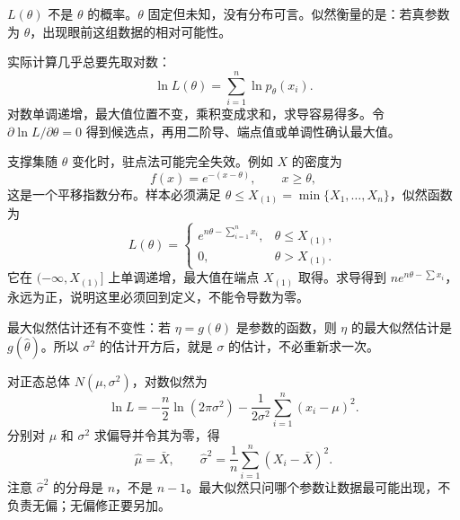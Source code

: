 $L(\theta)$ 不是 $\theta$ 的概率。$\theta$ 固定但未知，没有分布可言。似然衡量的是：若真参数为 $\theta$，出现眼前这组数据的相对可能性。

实际计算几乎总要先取对数：
\[
\ln L(\theta)=\sum_{i=1}^{n}\ln p_\theta(x_i).
\]
对数单调递增，最大值位置不变，乘积变成求和，求导容易得多。令 $\partial\ln L/\partial\theta=0$ 得到候选点，再用二阶导、端点值或单调性确认最大值。

支撑集随 $\theta$ 变化时，驻点法可能完全失效。例如 $X$ 的密度为
\[
f(x)=e^{-(x-\theta)},\qquad x\ge\theta,
\]
这是一个平移指数分布。样本必须满足 $\theta\le X_{(1)}=\min\{X_1,\ldots,X_n\}$，似然函数为
\[
L(\theta)=\begin{cases}
e^{n\theta-\sum_{i=1}^{n}x_i}, & \theta\le X_{(1)},\\
0, & \theta>X_{(1)}.
\end{cases}
\]
它在 $(-\infty,X_{(1)}]$ 上单调递增，最大值在端点 $X_{(1)}$ 取得。求导得到 $n e^{n\theta-\sum x_i}$，永远为正，说明这里必须回到定义，不能令导数为零。

最大似然估计还有不变性：若 $\eta=g(\theta)$ 是参数的函数，则 $\eta$ 的最大似然估计是 $g(\widehat\theta)$。所以 $\sigma^2$ 的估计开方后，就是 $\sigma$ 的估计，不必重新求一次。

对正态总体 $N(\mu,\sigma^2)$，对数似然为
\[
\ln L=-\frac n2\ln(2\pi\sigma^2)-\frac{1}{2\sigma^2}\sum_{i=1}^{n}(x_i-\mu)^2.
\]
分别对 $\mu$ 和 $\sigma^2$ 求偏导并令其为零，得
\[
\widehat\mu=\bar X,\qquad
\widehat\sigma^2=\frac1n\sum_{i=1}^{n}(X_i-\bar X)^2.
\]
注意 $\widehat\sigma^2$ 的分母是 $n$，不是 $n-1$。最大似然只问哪个参数让数据最可能出现，不负责无偏；无偏修正要另加。

\begin{center}
\end{center}

